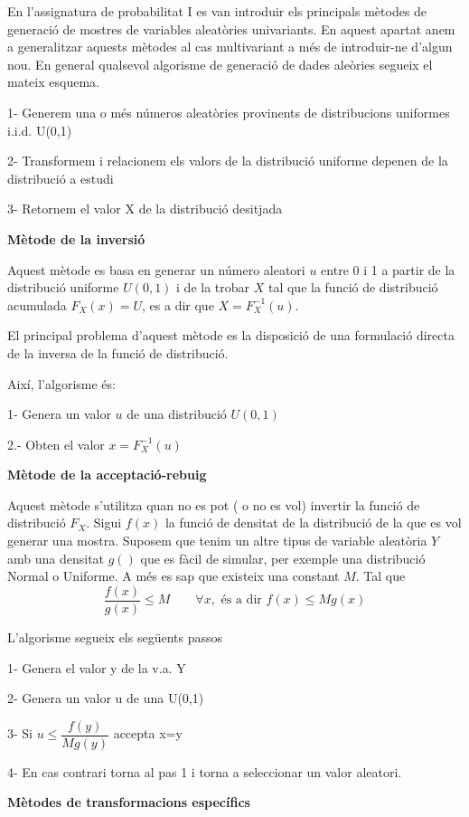 \documentclass[
  catalan,
]{article}
\theoremstyle{definition}
\theoremstyle{definition}
\theoremstyle{definition}
\theoremstyle{definition}
\theoremstyle{remark}
\begin{document}
En l'assignatura de probabilitat I es van introduir els principals mètodes de generació de mostres de variables aleatòries univariants. En aquest apartat anem a generalitzar aquests mètodes al cas multivariant a més de introduir-ne d'algun nou. En general qualsevol algorisme de generació de dades aleòries segueix el mateix esquema.

1- Generem una o més números aleatòries provinents de distribucions uniformes i.i.d. U(0,1)

2- Transformem i relacionem els valors de la distribució uniforme depenen de la distribució a estudi

3- Retornem el valor X de la distribució desitjada

\textbf{Mètode de la inversió}

Aquest mètode es basa en generar un número aleatori \(u\) entre 0 i 1 a partir de la distribució uniforme \(U(0,1)\) i de la trobar \(X\) tal que la funció de distribució acumulada \(F_X(x)= U\), es a dir que \(X= F_X^{-1}(u)\).

El principal problema d'aquest mètode es la disposició de una formulació directa de la inversa de la funció de distribució.

Així, l'algorisme és:

1- Genera un valor \(u\) de una distribució \(U(0,1)\)

2.- Obten el valor \(x= F_X^{-1}(u)\)

\textbf{Mètode de la acceptació-rebuig}

Aquest mètode s'utilitza quan no es pot ( o no es vol) invertir la funció de distribució \(F_X\). Sigui \(f(x)\) la funció de densitat de la distribució de la que es vol generar una mostra. Suposem que tenim un altre tipus de variable aleatòria \(Y\) amb una densitat \(g()\) que es fàcil de simular, per exemple una distribució Normal o Uniforme. A més es sap que existeix una constant \(M\). Tal que
\[
\dfrac {f(x)}{g(x)}\leq M \qquad \forall x , \text{ és a dir } f(x) \leq M g(x)
\]

L'algorisme segueix els següents passos

1- Genera el valor y de la v.a. Y

2- Genera un valor u de una U(0,1)

3- Si \(u \leq \dfrac {f(y)}{Mg(y)}\) accepta x=y

4- En cas contrari torna al pas 1 i torna a seleccionar un valor aleatori.

\textbf{Mètodes de transformacions específics}
\end{document}
